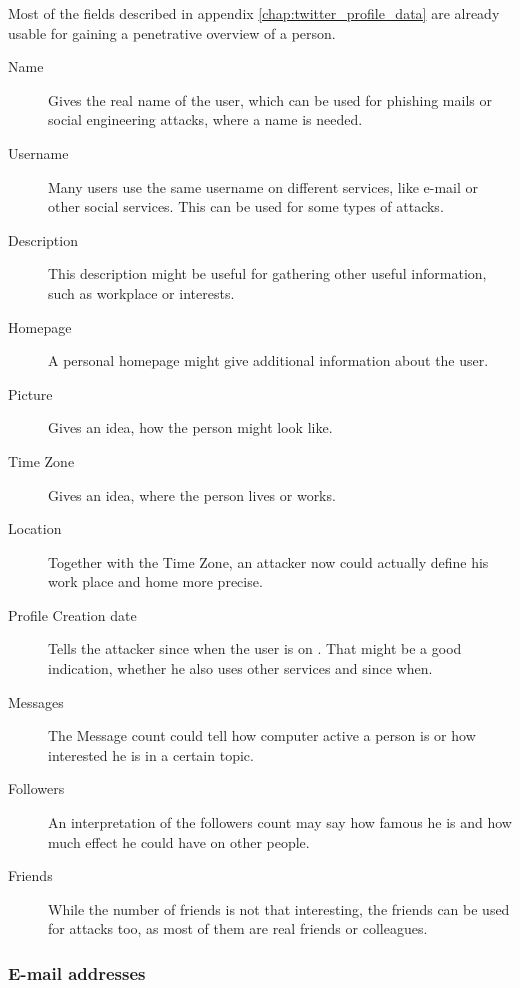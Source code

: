 Most of the fields described in appendix \ref{chap:twitter_profile_data} are
already usable for gaining a penetrative overview of a person.

\begin{description}
\item[Name] Gives the real name of the user, which can be used for
phishing mails or social engineering attacks, where a name is needed.

\item[Username] Many users use the same username on different
services, like e-mail or other social services. This can be used for some types
of attacks.

\item[Description] This description might be useful for gathering other useful
information, such as workplace or interests.

\item[Homepage] A personal homepage might give additional
information about the user.

\item[Picture] Gives an idea, how the person might
look like.

\item[Time Zone] Gives an idea, where the person
lives or works.

\item[Location] Together with the Time Zone, an attacker now
could actually define his work place and home more precise.

\item[Profile Creation date] Tells the attacker
since when the user is on \Twitter{}. That might be a good indication,
whether he also uses other services and since when.

\item[Messages] The Message count could tell how computer active a person is 
or how interested he is in a certain topic.

\item[Followers] An interpretation of the followers count may say how
famous he is and how much effect he could have on other people.

\item[Friends] While the number of friends is not that interesting,
the friends can be used for attacks too, as most of them are real friends
or colleagues.
\end{description}

\subsubsection{E-mail addresses}

